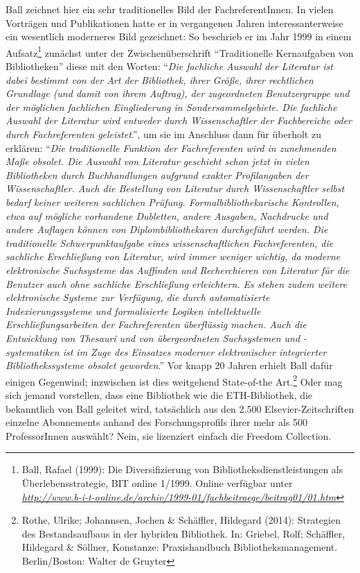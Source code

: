 \documentclass[a4paper,
fontsize=11pt,
oneside,
numbers=noperiodatend,
parskip=half-,
bibliography=totoc,
final
]{scrartcl}
\begin{document}
Ball zeichnet hier ein sehr traditionelles Bild der FachreferentInnen.
In vielen Vorträgen und Publikationen hatte er in vergangenen Jahren
interessanterweise ein wesentlich moderneres Bild gezeichnet: So
beschrieb er im Jahr 1999 in einem Aufsatz\footnote{Ball, Rafael (1999):
  Die Diversifizierung von Bibliotheksdienstleistungen als
  Überlebensstrategie, BIT online 1/1999. Online verfügbar unter
  \href{http://www.b-i-t-online.de/archiv/1999-01/fachbeitraege/beitrag01/01.htm}{\emph{http://www.b-i-t-online.de/archiv/1999-01/fachbeitraege/beitrag01/01.htm}}}
zunächst unter der Zwischenüberschrift \enquote{Traditionelle
Kernaufgaben von Bibliotheken} diese mit den Worten: \enquote{\emph{Die
fachliche Auswahl der Literatur ist dabei bestimmt von der Art der
Bibliothek, ihrer Größe, ihrer rechtlichen Grundlage (und damit von
ihrem Auftrag), der zugeordneten Benutzergruppe und der möglichen
fachlichen Eingliederung in Sondersammelgebiete. Die fachliche Auswahl
der Literatur wird entweder durch Wissenschaftler der Fachbereiche oder
durch Fachreferenten geleistet}.}, um sie im Anschluss dann für überholt
zu erklären: \enquote{\emph{Die traditionelle Funktion der
Fachreferenten wird in zunehmenden Maße obsolet. Die Auswahl von
Literatur geschieht schon jetzt in vielen Bibliotheken durch
Buchhandlungen aufgrund exakter Profilangaben der Wissenschaftler. Auch
die Bestellung von Literatur durch Wissenschaftler selbst bedarf keiner
weiteren sachlichen Prüfung. Formalbibliothekarische Kontrollen, etwa
auf mögliche vorhandene Dubletten, andere Ausgaben, Nachdrucke und
andere Auflagen können von Diplombibliothekaren durchgeführt werden. Die
traditionelle Schwerpunktaufgabe eines wissenschaftlichen
Fachreferenten, die sachliche Erschließung von Literatur, wird immer
weniger wichtig, da moderne elektronische Suchsysteme das Auffinden und
Recherchieren von Literatur für die Benutzer auch ohne sachliche
Erschließung erleichtern. Es stehen zudem weitere elektronische Systeme
zur Verfügung, die durch automatisierte Indexierungssysteme und
formalisierte Logiken intellektuelle Erschließungsarbeiten der
Fachreferenten überflüssig machen. Auch die Entwicklung von Thesauri und
von übergeordneten Suchsystemen und -systematiken ist im Zuge des
Einsatzes moderner elektronischer integrierter Bibliothekssysteme
obsolet geworden}.} Vor knapp 20 Jahren erhielt Ball dafür einigen
Gegenwind; inzwischen ist dies weitgehend State-of-the Art.\footnote{Rothe,
  Ulrike; Johannsen, Jochen \& Schäffler, Hildegard (2014): Strategien
  des Bestandsaufbaus in der hybriden Bibliothek. In: Griebel, Rolf;
  Schäffler, Hildegard \& Söllner, Konstanze: Praxishandbuch
  Bibliotheksmanagement. Berlin/Boston: Walter de Gruyter} Oder mag sich
jemand vorstellen, dass eine Bibliothek wie die ETH-Bibliothek, die
bekanntlich von Ball geleitet wird, tatsächlich aus den 2.500
Elsevier-Zeitschriften einzelne Abonnements anhand des Forschungsprofils
ihrer mehr als 500 ProfessorInnen auswählt? Nein, sie lizenziert einfach
die Freedom Collection.
\end{document}
